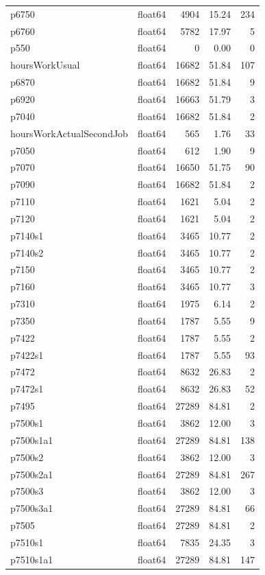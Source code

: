 \begin{longtable}{llrrr}
p6750 & float64 & 4904 & 15.24 & 234 \\
p6760 & float64 & 5782 & 17.97 & 5 \\
p550 & float64 & 0 & 0.00 & 0 \\
hoursWorkUsual & float64 & 16682 & 51.84 & 107 \\
p6870 & float64 & 16682 & 51.84 & 9 \\
p6920 & float64 & 16663 & 51.79 & 3 \\
p7040 & float64 & 16682 & 51.84 & 2 \\
hoursWorkActualSecondJob & float64 & 565 & 1.76 & 33 \\
p7050 & float64 & 612 & 1.90 & 9 \\
p7070 & float64 & 16650 & 51.75 & 90 \\
p7090 & float64 & 16682 & 51.84 & 2 \\
p7110 & float64 & 1621 & 5.04 & 2 \\
p7120 & float64 & 1621 & 5.04 & 2 \\
p7140s1 & float64 & 3465 & 10.77 & 2 \\
p7140s2 & float64 & 3465 & 10.77 & 2 \\
p7150 & float64 & 3465 & 10.77 & 2 \\
p7160 & float64 & 3465 & 10.77 & 3 \\
p7310 & float64 & 1975 & 6.14 & 2 \\
p7350 & float64 & 1787 & 5.55 & 9 \\
p7422 & float64 & 1787 & 5.55 & 2 \\
p7422s1 & float64 & 1787 & 5.55 & 93 \\
p7472 & float64 & 8632 & 26.83 & 2 \\
p7472s1 & float64 & 8632 & 26.83 & 52 \\
p7495 & float64 & 27289 & 84.81 & 2 \\
p7500s1 & float64 & 3862 & 12.00 & 3 \\
p7500s1a1 & float64 & 27289 & 84.81 & 138 \\
p7500s2 & float64 & 3862 & 12.00 & 3 \\
p7500s2a1 & float64 & 27289 & 84.81 & 267 \\
p7500s3 & float64 & 3862 & 12.00 & 3 \\
p7500s3a1 & float64 & 27289 & 84.81 & 66 \\
p7505 & float64 & 27289 & 84.81 & 2 \\
p7510s1 & float64 & 7835 & 24.35 & 3 \\
p7510s1a1 & float64 & 27289 & 84.81 & 147 \\

\end{longtable}
